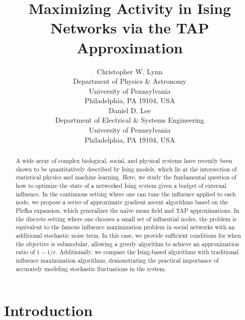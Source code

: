 \documentclass[letterpaper]{article} %
\begin{document}
%
\title{Maximizing Activity in Ising Networks via the TAP Approximation}
\author{Christopher W. Lynn \\
Department of Physics \& Astronomy \\
University of Pennsylvania \\
Philadelphia, PA 19104, USA \\
\And Daniel D. Lee \\
Department of Electrical \& Systems Engineering \\
University of Pennsylvania \\
Philadelphia, PA 19104, USA}

\maketitle
\begin{abstract}
A wide array of complex biological, social, and physical systems have recently been shown to be quantitatively described by Ising models, which lie at the intersection of statistical physics and machine learning. Here, we study the fundamental question of how to optimize the state of a networked Ising system given a budget of external influence. In the continuous setting where one can tune the influence applied to each node, we propose a series of approximate gradient ascent algorithms based on the Plefka expansion, which generalizes the na\"{i}ve mean field and TAP approximations. In the discrete setting where one chooses a small set of influential nodes, the problem is equivalent to the famous influence maximization problem in social networks with an additional stochastic noise term. In this case, we provide sufficient conditions for when the objective is submodular, allowing a greedy algorithm to achieve an approximation ratio of $1-1/e$. Additionally, we compare the Ising-based algorithms with traditional influence maximization algorithms, demonstrating the practical importance of accurately modeling stochastic fluctuations in the system.
\end{abstract}

\section{Introduction}
\end{document}
